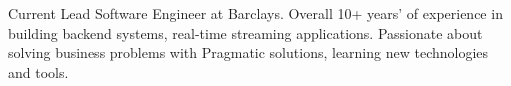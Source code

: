 

\begin{cvparagraph}

Current Lead Software Engineer at Barclays. Overall 10+ years' of experience in building backend systems, real-time streaming applications. Passionate about solving business problems with Pragmatic solutions, learning new technologies and tools.
\end{cvparagraph}

